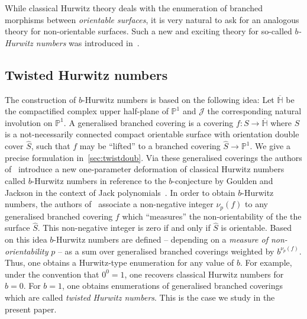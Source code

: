 \documentclass[ALCO,published]{cedram}
\begin{document}
While classical Hurwitz theory deals with the enumeration of branched morphisms between \textit{orientable surfaces}, it is very natural to ask for an analogous theory for non-orientable surfaces. Such a new and exciting theory for so-called \textit{$b$-Hurwitz numbers} was introduced in~\cite{chapuy2020non}.

\subsection{Twisted Hurwitz numbers}\label{sec-twistedsingle}
The construction of $b$-Hurwitz numbers is based on the following idea:  Let $\overline{\mathbb{H}}$ be the compactified complex upper half-plane of $\mathbb{P}^1$ and $\mathcal{J}$ the corresponding natural involution on $\mathbb{P}^1$. A generalised branched covering is a covering $f\colon S\to\overline{\mathbb{H}}$ where $S$ is a not-necessarily connected compact orientable surface with orientation double cover $\hat{S}$, such that $f$ may be ``lifted'' to a branched covering $\hat{S}\to\mathbb{P}^1$. We give a precise formulation in~\cref{sec:twistdoub}. Via these generalised coverings the authors of~\cite{chapuy2020non} introduce a new one-parameter deformation of classical Hurwitz numbers called $b$-Hurwitz numbers in reference to the $b$-conjecture by Goulden and Jackson in the context of Jack polynomials~\cite{goulden1996connection}. In order to obtain $b$-Hurwitz numbers, the authors of~\cite{chapuy2020non} associate a non-negative integer $\nu_p(f)$ to any generalised branched covering $f$ which ``measures'' the non-orientability of the the surface $\hat{S}$. This non-negative integer is zero if and only if $\hat{S}$ is orientable. Based on this idea $b$-Hurwitz numbers are defined -- depending on a \textit{measure of non-orientability} $p$ -- as a sum over generalised branched coverings weighted by $b^{\nu_p(f)}$. Thus, one obtains a Hurwitz-type enumeration for any value of $b$. For example, under the convention that $0^0=1$, one  recovers classical Hurwitz numbers for $b=0$. For $b=1$, one obtains enumerations of generalised branched coverings which are called \textit{twisted Hurwitz numbers}. This is the case we study in the present paper.
\end{document}
